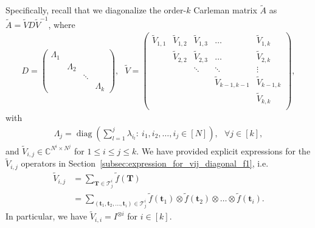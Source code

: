 \documentclass[superscriptaddress,onecolumn,nofootinbib,longbibliography,a4paper,accepted=2026-09-29]{quantumarticle}
\theoremstyle{plain}
\theoremstyle{definition}
\numberwithin{thm}{section}
\numberwithin{assumption}{section}
\numberwithin{lemma}{section}
\numberwithin{prop}{section}
\numberwithin{cor}{section}
\numberwithin{definition}{section}
\numberwithin{rmk}{section}
\numberwithin{equation}{section}
\newcommand{\myC}{\mathbb{C}}
\newcommand{\lrb}[1]{\left ( #1 \right )}
\newcommand{\diag}[1]{\operatorname{diag}\lrb{#1}}
\newcommand{\mbt}{\mathbf{t}}
\newcommand{\mbf}{\mathbf{T}}
\begin{document}
Specifically, recall that we diagonalize the order-$k$ Carleman matrix $\tilde{A}$ as $\tilde{A}=\tilde{V} D \tilde{V}^{-1}$, where 
\begin{align}
D=\begin{pmatrix}
        \Lambda_1  &           &        & \\
                 & \Lambda_2 &        & \\
                 &           & \ddots & \\
                 &           &      &\Lambda_k \end{pmatrix},~~~
        \tilde{V}=\begin{pmatrix}
        \tilde{V}_{1,1}  & \tilde{V}_{1,2}   &  \tilde{V}_{1,3} & \dots  & \tilde{V}_{1,k} \\
                 & \tilde{V}_{2,2}  &  \tilde{V}_{2,3} & \dots & \tilde{V}_{2,k} \\
                 &           & \ddots &   \ddots       & \vdots \\
                 &           &          & \tilde{V}_{k-1,k-1} & \tilde{V}_{k-1, k} \\
                &           &          &  & \tilde{V}_{k,k} \\\end{pmatrix},     
\end{align}
with 
\begin{align}
\Lambda_j=\diag{\sum_{l=1}^j \lambda_{i_l}:~i_1, i_2,\dots,i_j\in [N]}, ~~~\forall j \in [k],    
\end{align}
and $\tilde{V}_{i,j} \in \myC^{N^i \times N^j}$ for $1 \le i \le j \le k$.
We have provided explicit expressions for the $\tilde{V}_{i,j}$ operators in Section~\ref{subsec:expression_for_vij_diagonal_f1}, i.e. 
\begin{align}
    \tilde{V}_{i,j} &= \sum_{\mbf \in \mathcal{T}^i_j} \tilde{f}(\mbf) \\
    &= \sum_{(\mbt_1,\mbt_2,\dots,\mbt_i) \in \mathcal{T}^i_j}
    \tilde{f}(\mbt_1) \otimes \tilde{f}(\mbt_2) \otimes \dots \otimes \tilde{f}(\mbt_i).
\end{align}
In particular, we have $\tilde{V}_{i,i}=I^{\otimes i}$ for $i \in [k]$.
\end{document}

